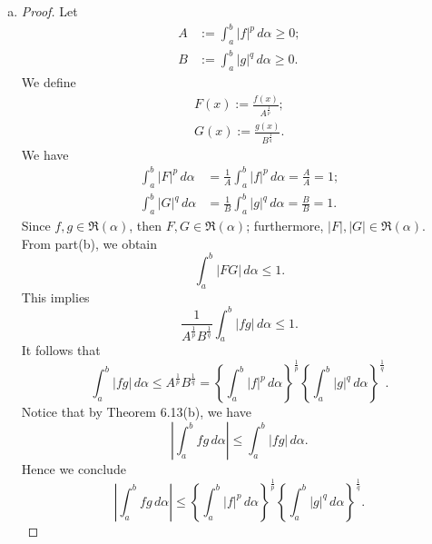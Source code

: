 \begin{Exercise}
\begin{enumerate}[(a)]
		\item
		\begin{proof}
			Let
			\begin{align*}
			A &:= \int_{a}^{b}|f|^p\, d\alpha \geq 0; \\
			B &:= \int_{a}^{b}|g|^q\, d\alpha \geq 0.
			\end{align*}
			We define
			\begin{align*}
			F(x) := \frac{f(x)}{A^{\frac{1}{p}}}; \\
			G(x) := \frac{g(x)}{B^{\frac{1}{q}}}.
			\end{align*}
			We have
			\begin{align*}
			\int_{a}^{b} |F|^p\, d\alpha 
			&= \frac{1}{A} \int_{a}^{b}|f|^p\, d\alpha 
			= \frac{A}{A} = 1; \\
			\int_{a}^{b} |G|^q\, d\alpha
			&= \frac{1}{B} \int_{a}^{b}|g|^q\, d\alpha 
			= \frac{B}{B} = 1.
			\end{align*}
			Since $f,g\in\mathfrak{R}(\alpha)$, then $F,G\in\mathfrak{R}(\alpha)$; furthermore, $|F|, |G|\in\mathfrak{R}(\alpha)$.
			From part(b), we obtain
			$$
			\int_{a}^{b} |FG|\, d\alpha \leq 1.
			$$
			This implies
			$$
			\frac{1}{A^{\frac{1}{p}}B^{\frac{1}{q}}} \int_{a}^{b} |fg|\, d\alpha \leq 1.
			$$
			It follows that
			$$
			\int_{a}^{b} |fg|\, d\alpha
			\leq A^{\frac{1}{p}} B^{\frac{1}{q}}
			= \left\{\int_{a}^{b}|f|^p\, d\alpha \right\}^{\frac{1}{p}} \left\{\int_{a}^{b}|g|^q\, d\alpha \right\}^{\frac{1}{q}}.
			$$
			Notice that by Theorem 6.13(b), we have
			$$
			\left| \int_{a}^{b} fg\, d\alpha \right| \leq \int_{a}^{b} |fg|\, d\alpha.
			$$
			Hence we conclude
			$$
			\left| \int_{a}^{b} fg\, d\alpha \right|
			\leq \left\{\int_{a}^{b}|f|^p\, d\alpha \right\}^{\frac{1}{p}} \left\{\int_{a}^{b}|g|^q\, d\alpha \right\}^{\frac{1}{q}}.
			$$
		\end{proof}
	\end{enumerate}
\end{Exercise}